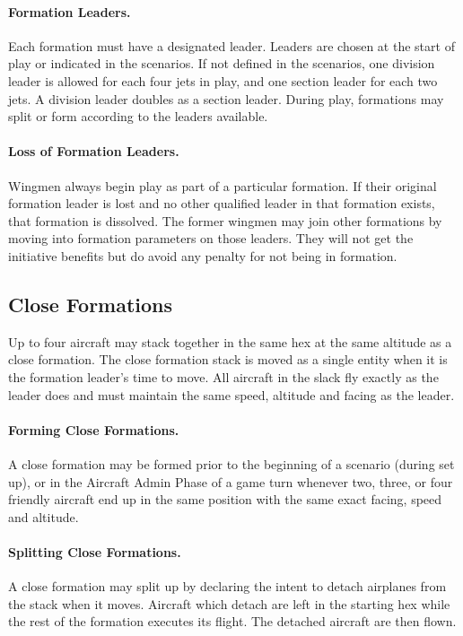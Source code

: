 \begin{advancedrules}
\paragraph{Formation Leaders.} Each formation must have a designated leader. Leaders are chosen at the start of play or indicated in the scenarios.  If not defined in the scenarios, one division leader is allowed for each four jets in play, and one section leader for each two jets. A division leader doubles as a section leader. During play, formations may split or form according to the leaders available.

\paragraph{Loss of Formation Leaders.} Wingmen always begin play as part of a particular formation. If their original formation leader is lost and no other qualified leader in that formation exists, that formation is dissolved. The former wingmen may join other formations by moving into formation parameters on those leaders. They will not get the initiative benefits but do avoid any penalty for not being in formation.

\subsection{Close Formations}
\label{rule:close-formations}

Up to four aircraft may stack together in the same hex at the same altitude as a close formation. The close formation stack is moved as a single entity when it is the formation leader's time to move. All aircraft in the slack fly exactly as the leader does and must maintain the same speed, altitude and facing as the leader.

\paragraph{Forming Close Formations.} A close formation may be formed prior to the beginning of a scenario (during set up), or in the Aircraft Admin Phase of a game turn whenever two, three, or four friendly aircraft end up in the same position with the same exact facing, speed and altitude.

\paragraph{Splitting Close Formations.} A close formation may split up by declaring the intent to detach airplanes from the stack when it moves. Aircraft which detach are left in the starting hex while the rest of the formation executes its flight. The detached aircraft are then flown.


\end{advancedrules}
